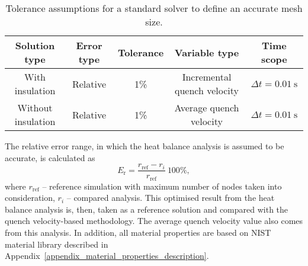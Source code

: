 \begin{table}[H]
    \caption{Tolerance assumptions for a standard solver to define an accurate mesh size.} 
    \vspace{-1.em} 
    \fontsize{10}{10}
    \selectfont 
    \renewcommand{\arraystretch}{1.5}
    \begin{center}
        \begin{tabular}{ ccccc }  
        \hline
        Solution type & Error type & Tolerance & Variable type & Time scope  \\
        \hline
        With insulation & Relative & 1\%  & Incremental quench velocity & $\Delta t=0.01~\text{s}$ \\
        Without insulation & Relative & 1\% & Average quench velocity & $\Delta t=0.01~\text{s}$ \\
        \hline 
        \end{tabular}
    \end{center}  
     \label{table: 1d_qv_benchmarking_tolerance_assumptions} 
 \end{table}

The relative error range, in which the heat balance analysis is assumed to be accurate, is calculated as
\begin{equation}
    E_\text{r} = \frac{r_\text{ref}-r_{i}}{r_\text{ref}}~100\%,
\end{equation}
where $r_\text{ref}$ -- reference simulation with maximum number of nodes taken into consideration, $r_{i}$ -- compared analysis. This optimised result from the heat balance analysis is, then, taken as a reference solution and compared with the quench velocity-based methodology. The average quench velocity value also comes from this analysis. In addition, all material properties are based on NIST material library described in Appendix~\ref{appendix_material_properties_description}. 